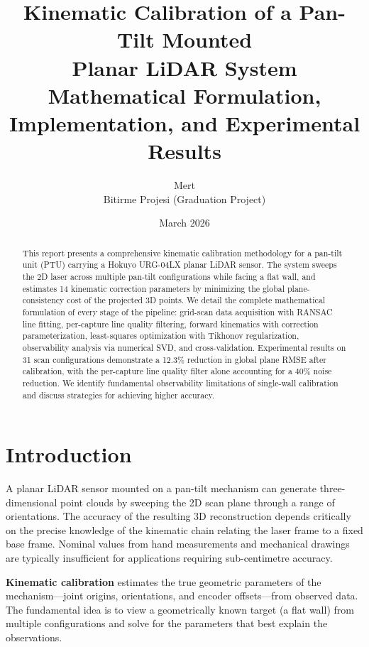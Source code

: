 \documentclass[12pt,a4paper]{article}
\title{%
    \textbf{Kinematic Calibration of a Pan-Tilt Mounted\\
    Planar LiDAR System}\\[0.5em]
    \large Mathematical Formulation, Implementation, and Experimental Results
}
\author{%
    Mert \\
    Bitirme Projesi (Graduation Project)
}
\date{March 2026}
\begin{document}
\maketitle

\begin{abstract}
This report presents a comprehensive kinematic calibration methodology for a
pan-tilt unit (PTU) carrying a Hokuyo URG-04LX planar LiDAR sensor. The system
sweeps the 2D laser across multiple pan-tilt configurations while facing a
flat wall, and estimates 14 kinematic correction parameters by minimizing the
global plane-consistency cost of the projected 3D points. We detail the
complete mathematical formulation of every stage of the pipeline:
grid-scan data acquisition with RANSAC line fitting, per-capture line quality
filtering, forward kinematics with correction parameterization,
least-squares optimization with Tikhonov regularization, observability
analysis via numerical SVD, and cross-validation. Experimental results on
31 scan configurations demonstrate a 12.3\% reduction in global plane RMSE
after calibration, with the per-capture line quality filter alone accounting
for a 40\% noise reduction. We identify fundamental observability limitations
of single-wall calibration and discuss strategies for achieving higher accuracy.
\end{abstract}

\tableofcontents
\newpage

\section{Introduction}
\label{sec:intro}

A planar LiDAR sensor mounted on a pan-tilt mechanism can generate
three-dimensional point clouds by sweeping the 2D scan plane through a
range of orientations. The accuracy of the resulting 3D reconstruction
depends critically on the precise knowledge of the kinematic chain
relating the laser frame to a fixed base frame. Nominal values from
hand measurements and mechanical drawings are typically insufficient
for applications requiring sub-centimetre accuracy.

\textbf{Kinematic calibration} estimates the true geometric parameters of the
mechanism---joint origins, orientations, and encoder offsets---from observed
data. The fundamental idea is to view a geometrically known target (a flat
wall) from multiple configurations and solve for the parameters that best
explain the observations.
\end{document}
